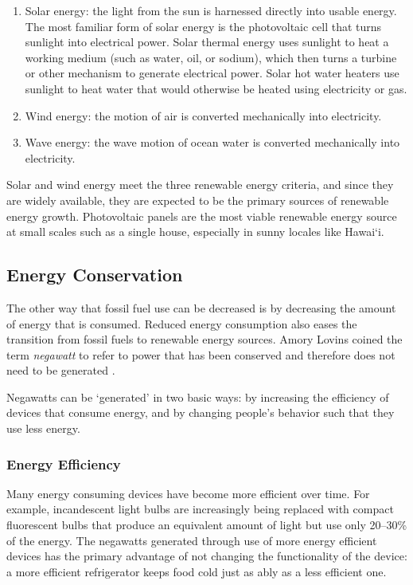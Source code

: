 \begin{enumerate}

\item Solar energy: the light from the sun is harnessed directly into usable energy. The most familiar form of solar energy is the photovoltaic cell that turns sunlight into electrical power. Solar thermal energy uses sunlight to heat a working medium (such as water, oil, or sodium), which then turns a turbine or other mechanism to generate electrical power. Solar hot water heaters use sunlight to heat water that would otherwise be heated using electricity or gas.

\item Wind energy: the motion of air is converted mechanically into electricity.

\item Wave energy: the wave motion of ocean water is converted mechanically into electricity.

\end{enumerate}

Solar and wind energy meet the three renewable energy criteria, and since they are widely available, they are expected to be the primary sources of renewable energy growth. Photovoltaic panels are the most viable renewable energy source at small scales such as a single house, especially in sunny locales like Hawai`i.

\subsection{Energy Conservation}

The other way that fossil fuel use can be decreased is by decreasing the amount of energy that is consumed. Reduced energy consumption also eases the transition from fossil fuels to renewable energy sources. Amory Lovins coined the term \emph{negawatt} to refer to power that has been conserved and therefore does not need to be generated \cite{Kolbert2007Mr-Green}.

Negawatts can be `generated' in two basic ways: by increasing the efficiency of devices that consume energy, and by changing people's behavior such that they use less energy.

\subsubsection{Energy Efficiency}

Many energy consuming devices have become more efficient over time. For example, incandescent light bulbs are increasingly being replaced with compact fluorescent bulbs that produce an equivalent amount of light but use only 20--30\% of the energy. The negawatts generated through use of more energy efficient devices has the primary advantage of not changing the functionality of the device: a more efficient refrigerator keeps food cold just as ably as a less efficient one.

